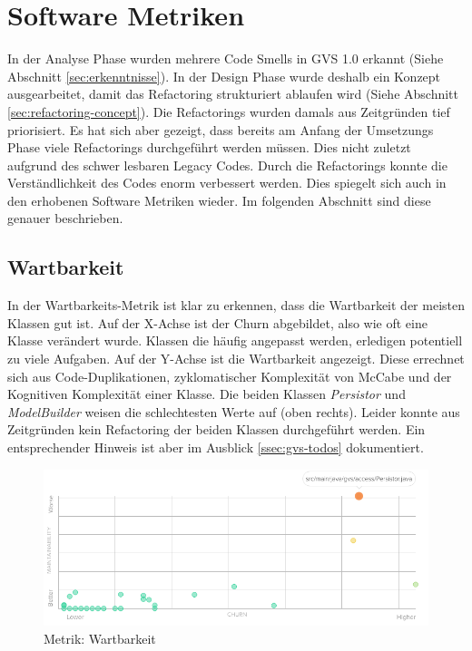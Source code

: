 \documentclass[11pt,a4paper,english,oneside]{book}
\numberwithin{equation}{chapter}
\begin{document}
	\section{Software Metriken} \label{sec:metrics-2}
	In der Analyse Phase wurden mehrere Code Smells in GVS 1.0 erkannt (Siehe Abschnitt \ref{sec:erkenntnisse}). In der Design Phase wurde deshalb ein Konzept ausgearbeitet, damit das Refactoring strukturiert ablaufen wird (Siehe Abschnitt \ref{sec:refactoring-concept}). Die Refactorings wurden damals aus Zeitgründen tief priorisiert. Es hat sich aber gezeigt, dass bereits am Anfang der Umsetzungs Phase viele Refactorings durchgeführt werden müssen. Dies nicht zuletzt aufgrund des schwer lesbaren Legacy Codes. Durch die Refactorings konnte die Verständlichkeit des Codes enorm verbessert werden. Dies spiegelt sich auch in den erhobenen Software Metriken wieder. Im folgenden Abschnitt sind diese genauer beschrieben.
	
	\subsection{Wartbarkeit}
	In der Wartbarkeits-Metrik \cite{metric-maintainability} ist klar zu erkennen, dass die Wartbarkeit der meisten Klassen gut ist. Auf der X-Achse ist der Churn \cite{metric-churn} abgebildet, also wie oft eine Klasse verändert wurde. Klassen die häufig angepasst werden, erledigen potentiell zu viele Aufgaben. Auf der Y-Achse ist die Wartbarkeit angezeigt. Diese errechnet sich aus Code-Duplikationen, zyklomatischer Komplexität von McCabe \cite{mccabe} und der Kognitiven Komplexität \cite{metric-cognitive-complexity} einer Klasse. Die beiden Klassen \textit{Persistor} und \textit{ModelBuilder} weisen die schlechtesten Werte auf (oben rechts). Leider konnte aus Zeitgründen kein Refactoring der beiden Klassen durchgeführt werden. Ein entsprechender Hinweis ist aber im Ausblick \ref{ssec:gvs-todos} dokumentiert.
	
	\clearpage
	
	\begin{figure}[h!]
		\centering
		\includegraphics[width=0.9\linewidth]{assets/images/metrics/maintainability}
		\caption{Metrik: Wartbarkeit}
		\label{fig:metric-maintainability}
	\end{figure}
	
\end{document}
